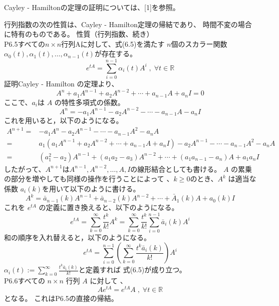 \documentclass{jsarticle}
\begin{document}
Cayley - Hamiltonの定理の証明については、[1]を参照。

行列指数の次の性質は、Cayley - Hamilton定理の帰結であり、
時間不変の場合に特有のものである。
\newpage
性質（行列指数、続き）\\ 
P6.5\;\;すべての$n\times n$行列Aに対して、式(6.5)を満たす
$n$個のスカラー関数$\alpha_0(t),\alpha_1(t),\dots,\alpha_{n-1}(t)$が存在する。
\begin{equation}
  e^{tA} = \sum^{n-1}_{i=0} \alpha_i(t)A^i \;,\;\forall t \in \mathbb{R} \tag{6.5}
\end{equation}
証明\;\;Cayley - Hamilton の定理より、
\begin{equation}
  A^n+a_1A^{n-1}+a_2A^{n-2}+\cdots+a_{n-1}A+a_nI = 0
\end{equation}
ここで、$a_i$は $A$ の特性多項式の係数。
\begin{equation}
  A^n = -a_1A^{n-1}-a_2A^{n-2}-\cdots-a_{n-1}A-a_nI
\end{equation}
これを用いると，以下のようになる。
\begin{equation}
  \begin{aligned}
    A^{n+1} =& -a_1A^{n}-a_2A^{n-1}-\cdots-a_{n-1}A^2-a_nA\\
    =& a_1(a_1A^{n-1}+a_2A^{n-2}+\cdots+a_{n-1}A+a_nI)-a_2A^{n-1}-\cdots-a_{n-1}A^2-a_nA\\
    =& (a_1^2-a_2)A^{n-1}+(a_1a_2-a_3)A^{n-2}+\cdots + (a_1a_{n-1}-a_n)A+a_1a_nI
  \end{aligned}
\end{equation}
したがって、$A^{n+1}$は$A^{n-1},A^{n-2},\dots,A,I$の線形結合としても書ける。
$A$ の累乗の部分を増やしても同様の操作を行うことによって
、$k \geq 0 $のとき、$A^k$ は適当な係数 $a_i( k ) $を用いて以下のように書ける。
\begin{equation}
  A^k = \bar{a}_{n-1}(k)A^{n-1} + \bar{a}_{n-2}(k)A^{n-2}+\cdots+\bar{A}_1(k)A+a_0(k)I \tag{6.6}
\end{equation}
これを $e^{tA}$ の定義に置き換えると、以下のようになる。
\begin{equation}
  e^{tA} = \sum^\infty_{k=0}\frac{t^k}{k!}A^k=\sum^\infty_{k=0}\frac{t^k}{k!}\sum^{n-1}_{i=0}\bar{a}_i(k)A^i
\end{equation}
和の順序を入れ替えると，以下のようになる。
\begin{equation}
  e^{tA} = \sum^{n-1}_{i=0}\left(\sum^\infty_{k=0}\frac{t^k\bar{a}_i(k)}{k!}\right)A^i
\end{equation}
$\alpha_i(t) := \sum^\infty_{k=0}\frac{t^k\bar{a}_i(k)}{k!}$と定義すれば 式(6.5)が成り立つ。\\
P6.6\;\;すべての $n \times n$ 行列 $A$ に対して 、
\begin{equation}
  Ae^{tA} = e^{tA}A\;,\;\forall t\in \mathbb{R}
\end{equation}
となる。
これはP6.5の直接の帰結。
\end{document}
